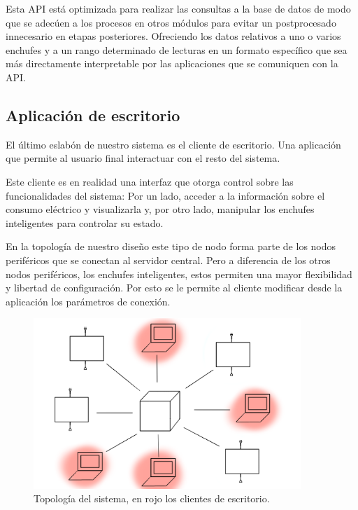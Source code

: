 \documentclass[a4paper,10pt]{article}
\begin{document}
Esta API está optimizada para realizar las consultas a la base de
datos de modo que se adecúen a los procesos en otros módulos para
evitar un postprocesado innecesario en etapas posteriores. Ofreciendo
los datos relativos a uno o varios enchufes y a un rango determinado
de lecturas en un formato específico que sea más directamente
interpretable por las aplicaciones que se comuniquen con la API.

\newpage

\subsection{Aplicación de escritorio}

El último eslabón de nuestro sistema es el cliente de escritorio. Una
aplicación que permite al usuario final interactuar con el resto del
sistema.

Este cliente es en realidad una interfaz que otorga control sobre las
funcionalidades del sistema: Por un lado, acceder a la información
sobre el consumo eléctrico y visualizarla y, por otro lado, manipular
los enchufes inteligentes para controlar su estado.

En la topología de nuestro diseño este tipo de nodo forma parte de los
nodos periféricos que se conectan al servidor central. Pero a
diferencia de los otros nodos periféricos, los enchufes inteligentes,
estos permiten una mayor flexibilidad y libertad de configuración. Por
esto se le permite al cliente modificar desde la aplicación los
parámetros de conexión.

\begin{figure}[H]
  \centering
  \includegraphics[width=0.9\textwidth]{img/esquema_estrella_nodos_finales_coloreados.png}
  \caption{Topología del sistema, en rojo los clientes de escritorio.}\label{fig:esquema-estrella-color}
\end{figure}
\end{document}
